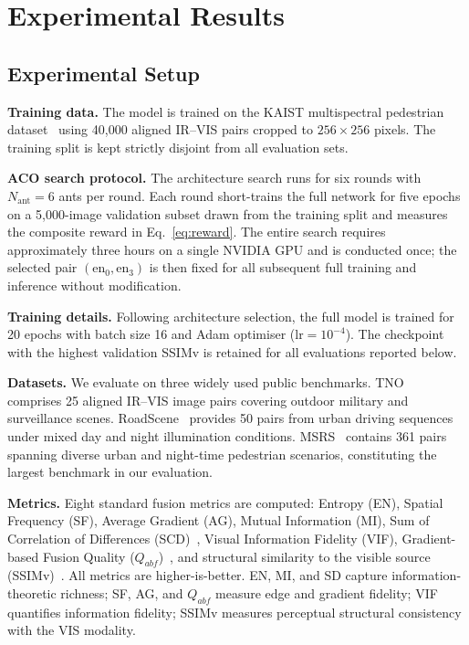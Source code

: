 \documentclass[a4paper,fleqn]{cas-dc}
\begin{document}
\section{Experimental Results}
\label{sec:exp}

\subsection{Experimental Setup}
\label{sec:exp:setup}

\textbf{Training data.}
The model is trained on the KAIST multispectral pedestrian
dataset~\cite{kaist2015} using 40{,}000 aligned IR--VIS pairs cropped to
$256\!\times\!256$ pixels.  The training split is kept strictly disjoint
from all evaluation sets.

\textbf{ACO search protocol.}
The architecture search runs for six rounds with $N_\mathrm{ant}=6$ ants
per round.  Each round short-trains the full network for five epochs on a
5{,}000-image validation subset drawn from the training split and measures
the composite reward in Eq.~\eqref{eq:reward}.  The entire search requires
approximately three hours on a single NVIDIA GPU and is conducted once;
the selected pair $(\mathrm{en}_0,\mathrm{en}_3)$ is then fixed for all
subsequent full training and inference without modification.

\textbf{Training details.}
Following architecture selection, the full model is trained for 20 epochs
with batch size 16 and Adam optimiser ($\mathrm{lr}=10^{-4}$).  The
checkpoint with the highest validation SSIMv is retained for all evaluations
reported below.

\textbf{Datasets.}
We evaluate on three widely used public benchmarks.
TNO~\cite{tno2014} comprises 25 aligned IR--VIS image pairs covering outdoor
military and surveillance scenes.
RoadScene~\cite{roadscene2020} provides 50 pairs from urban driving sequences
under mixed day and night illumination conditions.
MSRS~\cite{msrs2022} contains 361 pairs spanning diverse urban and night-time
pedestrian scenarios, constituting the largest benchmark in our evaluation.

\textbf{Metrics.}
Eight standard fusion metrics are computed: Entropy (EN), Spatial Frequency
(SF), Average Gradient (AG), Mutual Information (MI), Sum of Correlation of
Differences (SCD)~\cite{scd2015}, Visual Information Fidelity (VIF),
Gradient-based Fusion Quality ($Q_{abf}$)~\cite{qabf2008}, and structural
similarity to the visible source (SSIMv)~\cite{ssim2004}.  All metrics are
higher-is-better.  EN, MI, and SD capture information-theoretic richness;
SF, AG, and $Q_{abf}$ measure edge and gradient fidelity; VIF quantifies
information fidelity; SSIMv measures perceptual structural consistency with
the VIS modality.
\end{document}

